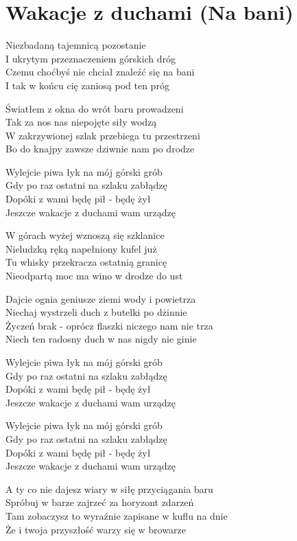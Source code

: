 \section{Wakacje z duchami (Na bani)}
\begin{text}
Niezbadaną tajemnicą pozostanie\\
I ukrytym przeznaczeniem górskich dróg\\
Czemu choćbyś nie chciał znaleźć się na bani\\
I tak w końcu cię zaniosą pod ten próg

Światłem z okna do wrót baru prowadzeni\\
Tak za nos nas niepojęte siły wodzą\\
W zakrzywionej szlak przebiega tu przestrzeni\\
Bo do knajpy zawsze dziwnie nam po drodze

\vin Wylejcie piwa łyk na mój górski grób\\
\vin Gdy po raz ostatni na szlaku zabłądzę\\
\vin Dopóki z wami będę pił - będę żył\\
\vin Jeszcze wakacje z duchami wam urządzę

W górach wyżej wznoszą się szklanice\\
Nieludzką ręką napełniony kufel już\\
Tu whisky przekracza ostatnią granicę\\
Nieodpartą moc ma wino w drodze do ust

Dajcie ognia geniusze ziemi wody i powietrza\\
Niechaj wystrzeli duch z butelki po dżinnie\\
Życzeń brak - oprócz flaszki niczego nam nie trza\\
Niech ten radosny duch w nas nigdy nie ginie

Wylejcie piwa łyk na mój górski grób\\
Gdy po raz ostatni na szlaku zabłądzę\\
Dopóki z wami będę pił - będę żył\\
Jeszcze wakacje z duchami wam urządzę

Wylejcie piwa łyk na mój górski grób\\
Gdy po raz ostatni na szlaku zabłądzę\\
Dopóki z wami będę pił - będę żył\\
Jeszcze wakacje z duchami wam urządzę

A ty co nie dajesz wiary w siłę przyciągania baru\\
Spróbuj w barze zajrzeć za horyzont zdarzeń\\
Tam zobaczysz to wyraźnie zapisane w kuflu na dnie\\
Że i twoja przyszłość warzy się w browarze
\end{text}
